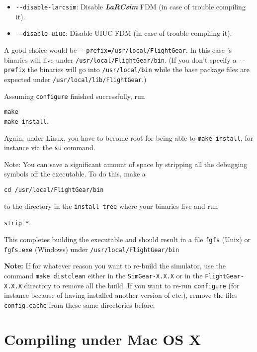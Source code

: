 \begin{enumerate}
\begin{itemize}
\item{\texttt{-$ $-disable-larcsim}}: Disable \textbf{\textit{LaRCsim}} FDM (in case of trouble compiling it).

\item{\texttt{-$ $-disable-uiuc}}: Disable UIUC FDM (in case of trouble compiling it).
\end{itemize}

A good choice would be \texttt{-$ $-prefix=/usr/local/FlightGear}. In this case
\FlightGear{}'s binaries will live under
\texttt{/usr/local/FlightGear/bin}. (If you don't specify a \texttt{-$ $-prefix} the binaries will go into \texttt{/usr/local/bin} while the base package files are expected under \texttt{/usr/local/lib/FlightGear}.)

Assuming \texttt{configure} finished successfully, run
 \medskip

        \texttt{make}\\
        \texttt{make install}.

 \noindent
 Again, under Linux, you have to become root for being able to \texttt{make
install}, for instance via the \texttt{su} command.

 \noindent
 Note:  You can save a significant amount of space by stripping all the
    debugging symbols off the executable.  To do this, make a
     \medskip

    \texttt{cd /usr/local/FlightGear/bin}

 \noindent
    to the directory in the \texttt{install tree} where your binaries live and run
     \medskip

    \texttt{strip *}.
  \end{enumerate}


 This completes building the executable and should result in a file \texttt{fgfs} (Unix) or
 \texttt{fgfs.exe} (Windows) under \texttt{/usr/local/FlightGear/bin}

\textbf{Note:} If for whatever reason you want to re-build the simulator, use the command
\texttt{make distclean} either in the \texttt{SimGear-X.X.X} or in the
\texttt{FlightGear-X.X.X} directory to remove all the build. If you want to re-run
\texttt{configure} (for instance because of having installed another version of \PLIB{}
etc.), remove the files \texttt{config.cache} from these same directories before.

\section{Compiling \FlightGear{} under Mac OS X }

